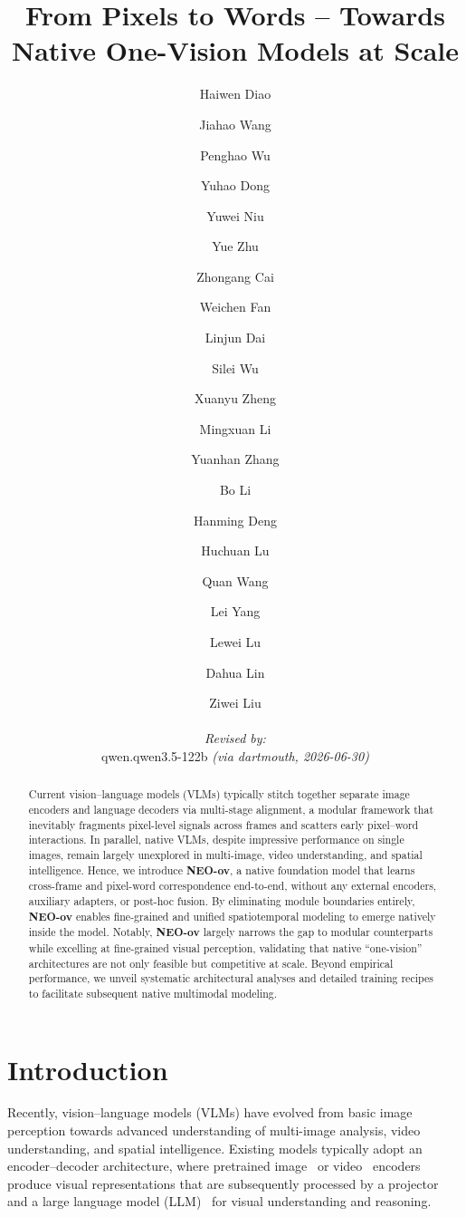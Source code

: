 \documentclass[11pt]{article}
\title{From Pixels to Words -- Towards Native One-Vision Models at Scale}
\author{
  Haiwen Diao \and Jiahao Wang \and Penghao Wu \and Yuhao Dong \and Yuwei Niu \and Yue Zhu \and Zhongang Cai \and Weichen Fan \and Linjun Dai \and Silei Wu \and Xuanyu Zheng \and Mingxuan Li \and Yuanhan Zhang \and Bo Li \and Hanming Deng \and Huchuan Lu \and Quan Wang \and Lei Yang \and Lewei Lu \and Dahua Lin \and Ziwei Liu
  \par\hrule\par
  \textit{Revised by:}\\
  qwen.qwen3.5-122b \textit{(via dartmouth, 2026-06-30)}
}
\begin{document}
\maketitle
\begin{abstract}

Current vision–language models (VLMs) typically stitch together separate image encoders and language decoders via multi-stage alignment, a modular framework that inevitably fragments pixel-level signals across frames and scatters early pixel–word interactions.
In parallel, native VLMs, despite impressive performance on single images, remain largely unexplored in multi-image, video understanding, and spatial intelligence.
%
Hence, we introduce \textbf{NEO-ov}, a native foundation model that learns cross-frame and pixel-word correspondence end-to-end, without any external encoders, auxiliary adapters, or post-hoc fusion. 
By eliminating module boundaries entirely, \textbf{NEO-ov} enables fine-grained and unified spatiotemporal modeling to emerge natively inside the model.
%
Notably, \textbf{NEO-ov} largely narrows the gap to modular counterparts while excelling at fine-grained visual perception, validating that native “one-vision” architectures are not only feasible but competitive at scale. 
%
Beyond empirical performance, we unveil systematic architectural analyses and detailed training recipes to facilitate subsequent native multimodal modeling.

\end{abstract}


\section{Introduction}
\label{sec:intro}

Recently, vision–language models (VLMs) have evolved from basic image perception towards advanced understanding of multi-image analysis, video understanding, and spatial intelligence.
%
Existing models typically adopt an encoder–decoder architecture, where pretrained image~\cite{VLP:CLIP,VLP:SigLIP} or video~\cite{VLM:videochat,VLM:LLaVAPrime} encoders produce visual representations that are subsequently processed by a projector~\cite{VLM:LLaVA-1.5,VLM:Deepstack,VLM:InstructBLIP,VLM:langbridge} and a large language model (LLM)~\cite{TransF:LLaMA2,TransF:Qwen3} for visual understanding and reasoning.
\end{document}

